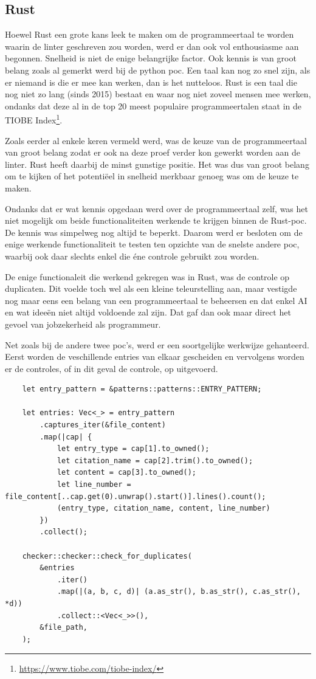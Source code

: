 \subsection{Rust}
Hoewel Rust een grote kans leek te maken om de programmeertaal te worden waarin de linter geschreven zou worden, werd er dan ook vol enthousiasme aan begonnen. Snelheid is niet de enige belangrijke factor. Ook kennis is van groot belang zoals al gemerkt werd bij de python poc. Een taal kan nog zo snel zijn, als er niemand is die er mee kan werken, dan is het nutteloos. Rust is een taal die nog niet zo lang (sinds 2015) bestaat en waar nog niet zoveel mensen mee werken, ondanks dat deze al in de top 20 meest populaire programmeertalen staat in de TIOBE Index\footnote{\url{https://www.tiobe.com/tiobe-index/}}.

Zoals eerder al enkele keren vermeld werd, was de keuze van de programmeertaal van groot belang zodat er ook na deze proef verder kon gewerkt worden aan de linter. Rust heeft daarbij de minst gunstige positie. Het was dus van groot belang om te kijken of het potentiëel in snelheid merkbaar genoeg was om de keuze te maken.

Ondanks dat er wat kennis opgedaan werd over de programmeertaal zelf, was het niet mogelijk om beide functionaliteiten werkende te krijgen binnen de Rust-poc. De kennis was simpelweg nog altijd te beperkt.
Daarom werd er besloten om de enige werkende functionaliteit te testen ten opzichte van de snelste andere poc, waarbij ook daar slechts enkel die éne controle gebruikt zou worden.

De enige functionaleit die werkend gekregen was in Rust, was de controle op duplicaten. Dit voelde toch wel als een kleine teleurstelling aan, maar vestigde nog maar eens een belang van een programmeertaal te beheersen en dat enkel AI en wat ideeën niet altijd voldoende zal zijn. Dat gaf dan ook maar direct het gevoel van jobzekerheid als programmeur.

Net zoals bij de andere twee poc's, werd er een soortgelijke werkwijze gehanteerd. Eerst worden de veschillende entries van elkaar gescheiden en vervolgens worden er de controles, of in dit geval de controle, op uitgevoerd.
\begin{verbatim}
    let entry_pattern = &patterns::patterns::ENTRY_PATTERN;

    let entries: Vec<_> = entry_pattern
        .captures_iter(&file_content)
        .map(|cap| {
            let entry_type = cap[1].to_owned();
            let citation_name = cap[2].trim().to_owned();
            let content = cap[3].to_owned();
            let line_number = file_content[..cap.get(0).unwrap().start()].lines().count();
            (entry_type, citation_name, content, line_number)
        })
        .collect();

    checker::checker::check_for_duplicates(
        &entries
            .iter()
            .map(|(a, b, c, d)| (a.as_str(), b.as_str(), c.as_str(), *d))
            .collect::<Vec<_>>(),
        &file_path,
    );
\end{verbatim}

